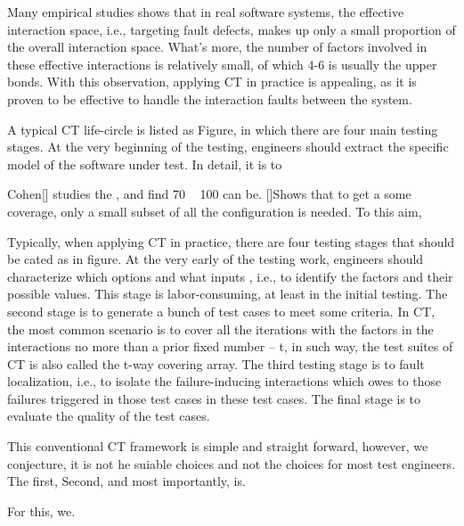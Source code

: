\documentclass{sig-alternate}
\begin{document}
Many empirical studies shows that in real software systems, the effective interaction space, i.e., targeting fault defects, makes up only a small proportion of the overall interaction space. What's more, the number of factors involved in these effective interactions is relatively small, of which 4-6 is usually the upper bonds. With this observation, applying CT in practice is appealing, as it is proven to be effective to handle the interaction faults between the system.

A typical CT life-circle is listed as Figure, in which there are four main testing stages. At the very beginning of the testing, engineers should extract the specific model of the software under test. In detail, it is to 

 Cohen[] studies the , and find 70 ~ 100 can be. []Shows that to get a some coverage, only a small subset of all the configuration is needed. To this aim,

Typically, when applying CT in practice, there are four testing stages that should be cated as in figure. At the very early of the testing work, engineers should characterize which options and what inputs , i.e., to identify the factors and their possible values. This stage is labor-consuming, at least in the initial testing. The second stage is to generate a bunch of test cases to meet some criteria. In CT, the most common scenario is to cover all the iterations with the factors in the interactions no more than a prior fixed number -- t, in such way, the test suites of CT is also called the t-way covering array.  The third testing stage is to fault localization, i.e., to isolate the failure-inducing interactions which owes to those failures triggered in those test cases in these test cases. The final stage is to evaluate the quality of the test cases.

This conventional CT framework is simple and straight forward, however, we conjecture, it is not he suiable choices and not the choices for most test engineers.  The first,   Second, and most importantly, is.

For this, we.

\end{document}
